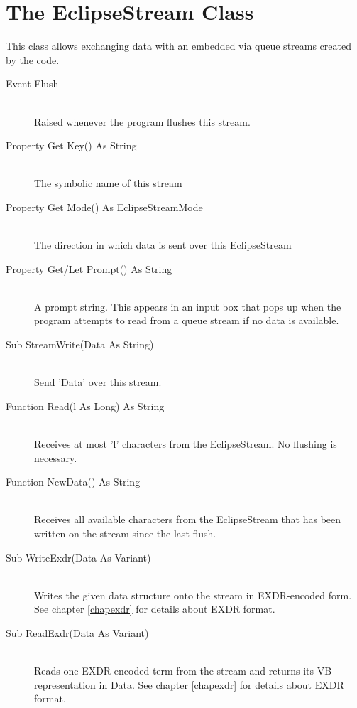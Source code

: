 \section{The EclipseStream Class}
This class allows exchanging data with an embedded {\eclipse} via
queue streams created by the {\eclipse} code.
\begin{description}
\item[Event Flush]\ \\
	Raised whenever the {\eclipse} program flushes this stream.

\item[Property Get Key() As String]\ \\
	The symbolic name of this stream

\item[Property Get Mode() As EclipseStreamMode]\ \\
	The direction in which data is sent over this EclipseStream

\item[Property Get/Let Prompt() As String]\ \\
	A prompt string. This appears in an input box that pops up
	when the {\eclipse} program attempts to read from a queue
	stream if no data is available.

\item[Sub StreamWrite(Data As String)]\ \\
	Send 'Data' over this stream.

\item[Function Read(l As Long) As String]\ \\
	Receives at most 'l' characters from the EclipseStream.
	No flushing is necessary.

\item[Function NewData() As String]\ \\
	Receives all available characters from the EclipseStream
	that has been written on the stream since the last flush.

\item[Sub WriteExdr(Data As Variant)]\ \\
	Writes the given data structure onto the stream in EXDR-encoded form.
	See chapter \ref{chapexdr} for details about EXDR format.

\item[Sub ReadExdr(Data As Variant)]\ \\
	Reads one EXDR-encoded term from the stream and returns its
	VB-representation in Data.
	See chapter \ref{chapexdr} for details about EXDR format.
\end{description}

